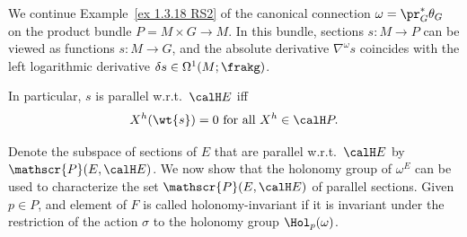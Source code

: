 \begin{example}
    We continue Example~\ref{ex 1.3.18 RS2} of the canonical connection $\omega=\pr_G^\ast\theta_G$ on the product bundle $P=M\times G\to M$. In this bundle, sections $s:M\to P$ can be viewed as functions $s:M\to G$, and the absolute derivative $\nabla^\omega s$ coincides with the left logarithmic derivative $\delta s\in\Omega^1(M;\frakg)$.
\end{example}



\begin{cor}\label{cor 1.5.7 RS2 my version}
    In particular, $s$ is parallel w.r.t.\ $\calH E$ iff
    \[X^h(\wt{s})=0\text{ for all }X^h\in\calH P.\]
\end{cor}


Denote the subspace of sections of $E$ that are parallel w.r.t.\ $\calH E$ by $\mathscr{P}(E,\calH E)$.  We now show that the holonomy group of $\omega^E$ can be used to characterize the set $\mathscr{P}(E,\calH E)$ of parallel sections. Given $p\in P$, and element of $F$ is called holonomy-invariant if it is invariant under the restriction of the action $\sigma$ to the holonomy group $\Hol_p(\omega)$.

